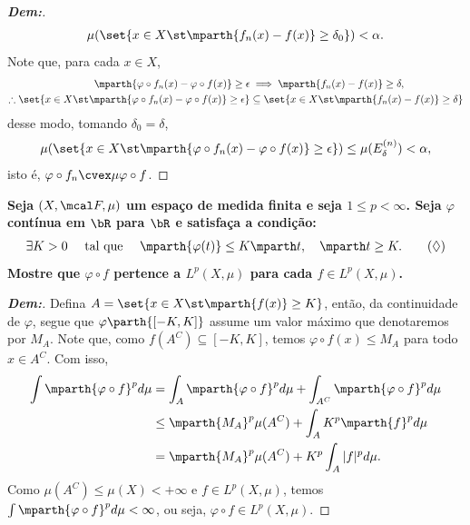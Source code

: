 \begin{proof}[\textbf{Dem:}]
\begin{align*}
    \mu(\set{x \in X \st \mparth{f_n(x) - f(x)}\ge \delta_0})< \alpha.
  \end{align*}
  Note que, para cada $x \in X$,
  \begin{align*}
    \mparth{\varphi\circ f_n (x) - \varphi \circ f(x)} \ge \epsilon 
    &\implies \mparth{f_n(x) - f(x)} \ge \delta,\\
    \therefore 
    \set{x \in X \st \mparth{\varphi \circ f_n(x) - \varphi \circ f(x)}\ge \epsilon}
    &\subseteq \set{x \in X \st \mparth{f_n(x) - f(x)}\ge \delta} 
  \end{align*}
  desse modo, tomando $\delta_0 = \delta$, 
  \begin{align*}
    \mu(\set{x \in X \st \mparth{\varphi \circ f_n(x) - \varphi \circ f(x)}\ge \epsilon})
    \le \mu(E_\delta^{(n)}) <\alpha, 
  \end{align*}
  isto é, $\varphi \circ f_n \cvex \mu \varphi \circ f$.
\end{proof}

\textbf{Seja $(X, \mcal F, \mu)$ um espaço de medida finita e 
seja $1 \le p < \infty$. Seja $\varphi$ contínua em $\bR$ para $\bR$ e 
satisfaça a condição: 
\begin{align*}
  \exists K > 0\quad \text{ tal que } \quad
  \mparth {\varphi (t)} \le K\mparth t, \quad \mparth t \ge K.
  \tag{$\Diamond$}
  \label{5.13.0}
\end{align*} 
Mostre que $\varphi \circ f$ pertence a $L^p(X, \mu)$ para cada $f \in L^p(X, \mu)$.}
\begin{proof}[\textbf{Dem:}] Defina $A = \set{x \in X \st \mparth{f(x)} \ge K}$, então,
  da continuidade de $\varphi$, segue que $\varphi\parth{[-K, K]}$  
  assume um valor máximo que denotaremos por $M_A$. Note que, como 
  $f(A^C) \subseteq [-K, K]$, temos $\varphi \circ f(x) \le M_A$ para todo $x \in A^C$.
  Com isso,
  \begin{align*}
    \int \mparth{\varphi \circ f}^p d\mu 
    &= \int_A \mparth{\varphi \circ f}^p d\mu + 
    \int_{A^C} \mparth{\varphi \circ f}^p d\mu\\ 
    &\le \mparth{M_A}^p\mu(A^C) 
    + \int_{A} K^p \mparth{f}^p d\mu\\ 
    &= \mparth{M_A}^p \mu(A^C) + K^p \int_A |f|^p d\mu.   
  \end{align*}
  Como $\mu(A^C) \le \mu(X) < +\infty$ e $f \in L^p(X, \mu)$, temos 
  $\int \mparth{\varphi \circ f}^p d\mu < \infty$, ou seja, 
  $\varphi \circ f \in L^p(X, \mu)$.
\end{proof}


